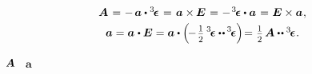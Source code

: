 \nopagebreak\vspace{-0.25em}\begin{equation}\label{companionvector}
\begin{array}{c}
\bm{A} \hspace{.2ex} = \hspace{.1ex} - \hspace{.3ex} \bm{a} \dotp \permutationsparitytensor \hspace{.2ex} = \hspace{.2ex} \bm{a} \times\hspace{-0.1ex} \UnitDyad \hspace{.2ex} = \hspace{.1ex} - \hspace{.2ex} \permutationsparitytensor \dotp \bm{a} \hspace{.2ex} = \hspace{.1ex} \UnitDyad \times \bm{a}
\hspace{.1ex} ,
\\[.3em]
%
\bm{a} = \bm{a} \hspace{.1ex} \dotp \UnitDyad = \bm{a} \dotp \left( \hspace{-0.3ex} - \displaystyle \hspace{.2ex} \smalldisplaystyleonehalf \hspace{.4ex} \permutationsparitytensor \dotdotp \hspace{-0.1ex} \permutationsparitytensor \right) \hspace{-0.4ex} = \hspace{.1ex} \smalldisplaystyleonehalf \hspace{.32ex} \bm{A} \dotdotp \permutationsparitytensor
\hspace{.1ex} .
\end{array}
\end{equation}

~${\hspace{-0.2ex}\bm{A}}$
~$\bm{a}$

